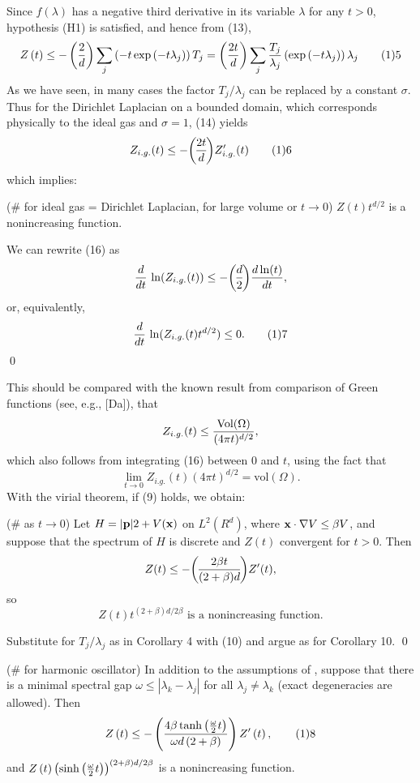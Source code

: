 Since $f(\lambda)$ has a negative third derivative in its variable 
$\lambda$ for any $t>0$, hypothesis (H1) is satisfied, and hence from (13), 
$$
Z\left(t\right) \le  -\left({2 \over d}\right) \sum\limits_{
j}  \left(-t \exp \left(-t \lambda_j\right)\right) 
T_j = \left({2 t \over d}\right) \sum\limits_{j}  
{T_j \over {\lambda }_{j}} \left(\exp \left(-t \lambda 
_j\right)\right) \lambda_j    \tag 15  $$
As we have seen, in many cases the factor $T_{j} /\lambda_{j}$ can 
be replaced by a constant $\sigma$.  Thus for the Dirichlet Laplacian on a 
bounded domain, which corresponds physically to the ideal gas and 
$\sigma=1$, (14) yields 
$$Z_{i.g.}(t)\le -{2t\overwithdelims() d}Z'_{i.g.}(t)\tag 16
$$
which implies:

(\# for ideal gas = Dirichlet Laplacian, for large volume or 
$t\rightarrow 0$)  $Z(t) t^{d/2}$ is a nonincreasing function.
\endproclaim

We can rewrite (16) as 
$$                              
{d\over dt}\,\ln (Z_{i.g.}(t))\le -{d\overwithdelims () 2}
{d\ln (t)\over dt},$$
or, equivalently,
$${d\over dt}\,\ln (Z_{i.g.}(t)t^{d/2})\le 0.\tag 17$$
\hfill\qed\enddemo


This should be compared with the known result from comparison of Green 
functions (see, e.g., [Da]), that 
$$
Z_{i.g.}(t)  \le  {\text{Vol}(\Omega)\over
(4 \pi t)^{d/2}},
$$
which also follows from integrating (16) between 0 and $t$, 
using the fact that 
$$\lim_{t\to 0} Z_{i.g.}(t)(4\pi t)^{d/2} =\text{vol}(\Omega).$$
With the virial theorem, if (9) holds, we obtain:

(\# as $t \rightarrow 0$)  Let $H =   |{\bold p}|2 + 
V({\bold x})$ on $L^2(R^d)$, 
where ${\bold x}\cdot \nabla V   \le  
\beta V$, and suppose that the spectrum of $H$ is 
discrete and $Z(t)$ convergent for $t>0$.  Then 
$$
Z(t)\le -{2\beta t\overwithdelims () (2+\beta)d} Z'(t),$$
so 
$$
Z(t)t^{(2+\beta)d/2\beta}\text{ is a nonincreasing function.}
$$
\endproclaim

Substitute for $T_j/\lambda_{j}$ as in Corollary 4  with (10) and 
argue as for Corollary 10.     
\hfill\qed\enddemo 

(\# for harmonic oscillator)\/ In addition to the assumptions 
of , suppose that there is a minimal spectral gap 
$\omega  \le  
|\lambda_{k} - \lambda_{j}|$ for all $\lambda_{j} \ne
\lambda_{k}$  (exact degeneracies are allowed).  Then
$${Z} \left({t}\right) \le  - \left({4\beta  \tanh \left({\omega  
\over 2}t\right) \over \omega d\left(2+\beta \right)}\right) 
{Z}^{\prime}\left({t}\right),          \tag 18   $$
and 
$
{Z} \left({t}\right) {\left({\sinh \left({{\omega  \over 
2}t}\right)}\right)}^{(2+\beta )d/2\beta }    $
is a nonincreasing function.
\endproclaim

